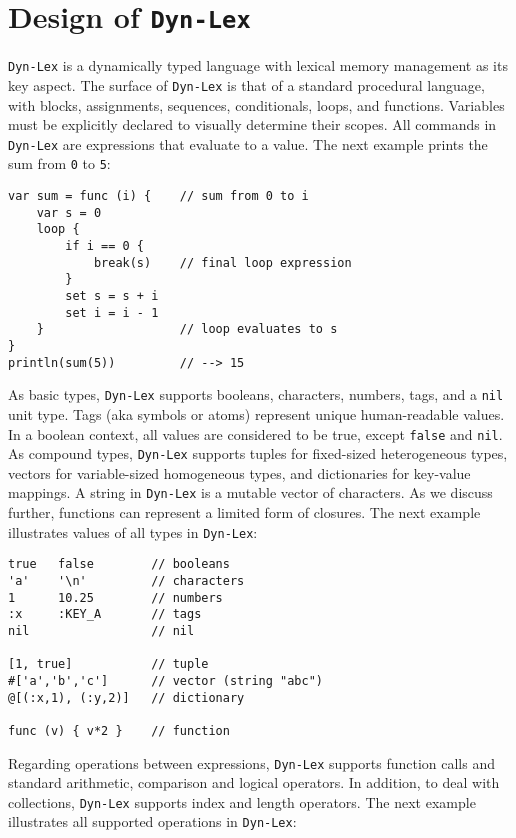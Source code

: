 \documentclass[12pt]{article}
\newcommand{\code}[1] {\texttt{\footnotesize{#1}}}
\newcommand{\lex} {\texttt{Dyn-Lex}\xspace}
\begin{document}
\section{Design of \lex}
\label{sec.design}

\lex is a dynamically typed language with lexical memory management as its key
aspect.
The surface of \lex is that of a standard procedural language, with blocks,
assignments, sequences, conditionals, loops, and functions.
Variables must be explicitly declared to visually determine their scopes.
All commands in \lex are expressions that evaluate to a value.
The next example prints the sum from \code{0} to \code{5}:

{\footnotesize
\begin{verbatim}
var sum = func (i) {    // sum from 0 to i
    var s = 0
    loop {
        if i == 0 {
            break(s)    // final loop expression
        }
        set s = s + i
        set i = i - 1
    }                   // loop evaluates to s
}
println(sum(5))         // --> 15
\end{verbatim}
}

As basic types, \lex supports booleans, characters, numbers, tags, and a
\code{nil} unit type.
Tags (aka symbols or atoms) represent unique human-readable values.
In a boolean context, all values are considered to be true, except \code{false}
and \code{nil}.
As compound types, \lex supports
    tuples for fixed-sized heterogeneous types,
    vectors for variable-sized homogeneous types, and
    dictionaries for key-value mappings.
A string in \lex is a mutable vector of characters.
As we discuss further, functions can represent a limited form of closures.
The next example illustrates values of all types in \lex:

{\footnotesize
\begin{verbatim}
true   false        // booleans
'a'    '\n'         // characters
1      10.25        // numbers
:x     :KEY_A       // tags
nil                 // nil

[1, true]           // tuple
#['a','b','c']      // vector (string "abc")
@[(:x,1), (:y,2)]   // dictionary

func (v) { v*2 }    // function
\end{verbatim}
}

Regarding operations between expressions, \lex supports function calls and
standard arithmetic, comparison and logical operators.
In addition, to deal with collections, \lex supports index and length
operators.
The next example illustrates all supported operations in \lex:
\end{document}
